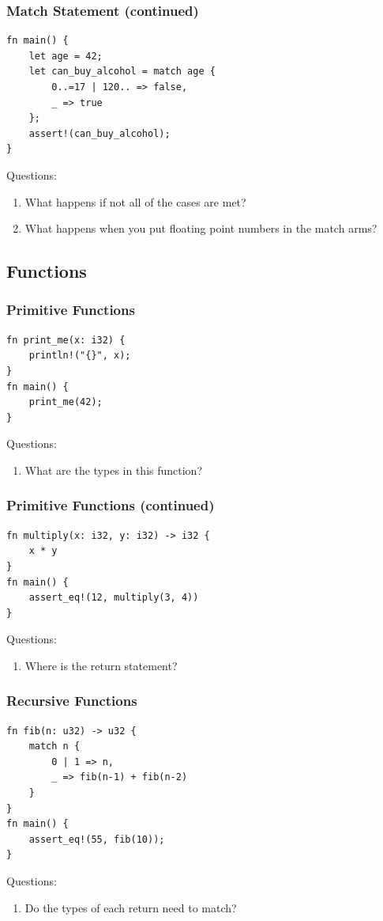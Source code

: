 \documentclass{slides}
\begin{document}
\begin{frame}[fragile]
\frametitle{Match Statement (continued)}
\begin{verbatim}
fn main() {
    let age = 42;
    let can_buy_alcohol = match age {
        0..=17 | 120.. => false,
        _ => true
    };
    assert!(can_buy_alcohol);
}
\end{verbatim}
Questions:
\begin{enumerate}
    \item What happens if not all of the cases are met?
    \item What happens when you put floating point numbers in the match arms?
\end{enumerate}
\end{frame}

\begin{frame}
\section{Functions}
\end{frame}

\begin{frame}[fragile]
\frametitle{Primitive Functions}
\begin{verbatim}
fn print_me(x: i32) {
    println!("{}", x);
}
fn main() {
    print_me(42);
}
\end{verbatim}
Questions:
\begin{enumerate}
    \item What are the types in this function?
\end{enumerate}
\end{frame}

\begin{frame}[fragile]
\frametitle{Primitive Functions (continued)}
\begin{verbatim}
fn multiply(x: i32, y: i32) -> i32 {
    x * y
}
fn main() {
    assert_eq!(12, multiply(3, 4))
}
\end{verbatim}
Questions:
\begin{enumerate}
    \item Where is the return statement?
\end{enumerate}
\end{frame}

\begin{frame}[fragile]
\frametitle{Recursive Functions}
\begin{verbatim}
fn fib(n: u32) -> u32 {
    match n {
        0 | 1 => n,
        _ => fib(n-1) + fib(n-2)
    }
}
fn main() {
    assert_eq!(55, fib(10));
}
\end{verbatim}
Questions:
\begin{enumerate}
    \item Do the types of each return need to match?
\end{enumerate}
\end{frame}
\end{document}
